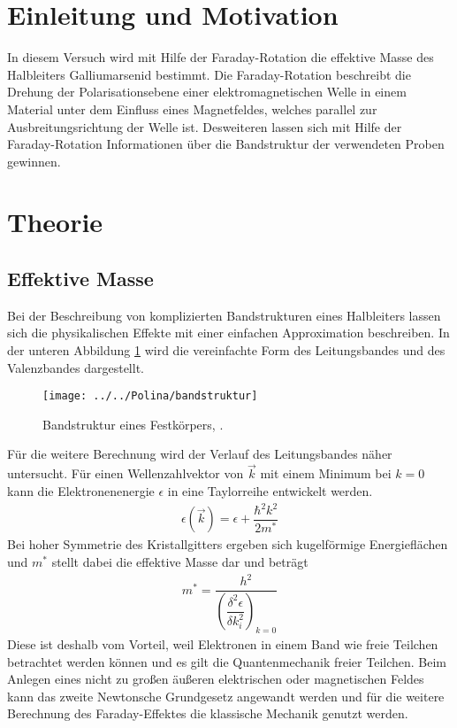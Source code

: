 \section{Einleitung und Motivation}

In diesem Versuch wird mit Hilfe der Faraday-Rotation die effektive Masse des Halbleiters Galliumarsenid bestimmt. Die Faraday-Rotation beschreibt die Drehung der Polarisationsebene einer elektromagnetischen Welle in einem Material unter dem Einfluss eines Magnetfeldes, welches parallel zur Ausbreitungsrichtung der Welle ist. Desweiteren lassen sich mit Hilfe der Faraday-Rotation Informationen über die Bandstruktur der verwendeten Proben gewinnen. 

\section{Theorie}

\subsection{Effektive Masse}
Bei der Beschreibung von komplizierten Bandstrukturen eines Halbleiters lassen sich die physikalischen Effekte mit einer einfachen Approximation beschreiben. In der unteren Abbildung \ref{fig:bandstruktur} wird die vereinfachte Form des Leitungsbandes und des Valenzbandes dargestellt.
\begin{figure}[h!]
	\centering
	\texttt{[image: ../../Polina/bandstruktur]}
	\caption{Bandstruktur eines Festkörpers, \cite{anleitungV46}.}
	\label{fig:bandstruktur}
\end{figure}
Für die weitere Berechnung wird der Verlauf des Leitungsbandes näher untersucht. Für einen Wellenzahlvektor von $\vec{k}$ mit einem Minimum bei $k=0$ kann die Elektronenenergie $\epsilon$ in eine Taylorreihe entwickelt werden.
\begin{align}
\epsilon(\vec{k})=\epsilon+ \dfrac{\hbar^2k^2}{2m^{\ast}}
\end{align}
Bei hoher Symmetrie des Kristallgitters ergeben sich kugelförmige Energieflächen und $m^{\ast}$ stellt dabei die effektive Masse dar und beträgt
\begin{align}
m^{\ast}=\dfrac{h^2}{\left(\dfrac{\delta^2\epsilon}{\delta k_i^2}\right)_{k=0}}
\end{align}
Diese ist deshalb vom Vorteil, weil Elektronen in einem Band wie freie Teilchen betrachtet werden können und es gilt die Quantenmechanik freier Teilchen. Beim Anlegen eines nicht zu großen äußeren elektrischen oder magnetischen Feldes kann das zweite Newtonsche Grundgesetz angewandt werden und für die weitere Berechnung des Faraday-Effektes die klassische Mechanik genutzt werden. 
